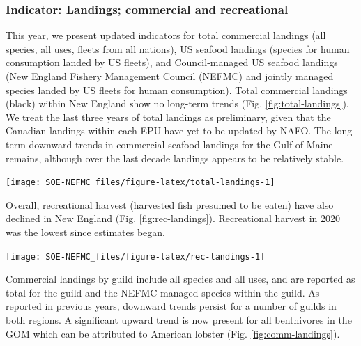 \documentclass[
  10pt,
]{article}
\let\origfigure\figure
\let\endorigfigure\endfigure
\renewenvironment{figure}[1][2] {
    \expandafter\origfigure\expandafter[H]
} {
    \endorigfigure
}
\begin{document}
\hypertarget{indicator-landings-commercial-and-recreational}{%
\subsubsection{Indicator: Landings; commercial and recreational}\label{indicator-landings-commercial-and-recreational}}

This year, we present updated indicators for total commercial landings (all species, all uses, fleets from all nations), US seafood landings (species for human consumption landed by US fleets), and Council-managed US seafood landings (New England Fishery Management Council (NEFMC) and jointly managed species landed by US fleets for human consumption). Total commercial landings (black) within New England show no long-term trends (Fig. \ref{fig:total-landings}). We treat the last three years of total landings as preliminary, given that the Canadian landings within each EPU have yet to be updated by NAFO. The long term downward trends in commercial seafood landings for the Gulf of Maine remains, although over the last decade landings appears to be relatively stable.

\begin{figure}

{\centering \texttt{[image: SOE-NEFMC\_files/figure-latex/total-landings-1]} 

}

\caption{Total commercial landings (black), total U.S. seafood landings (blue), and New England managed U.S. seafood landings (red) for Georges Bank and the Gulf of Maine.  Open circles represent years that are lacking NAFO (foreign) data. mt = metric tons}\label{fig:total-landings}
\end{figure}

Overall, recreational harvest (harvested fish presumed to be eaten) have also declined in New England (Fig. \ref{fig:rec-landings}). Recreational harvest in 2020 was the lowest since estimates began.

\begin{figure}

{\centering \texttt{[image: SOE-NEFMC\_files/figure-latex/rec-landings-1]} 

}

\caption{Total recreational seafood harvest (millions of pounds) in the New England region.}\label{fig:rec-landings}
\end{figure}

Commercial landings by guild include all species and all uses, and are reported as total for the guild and the NEFMC managed species within the guild. As reported in previous years, downward trends persist for a number of guilds in both regions. A significant upward trend is now present for all benthivores in the GOM which can be attributed to American lobster (Fig. \ref{fig:comm-landings}).
\end{document}
